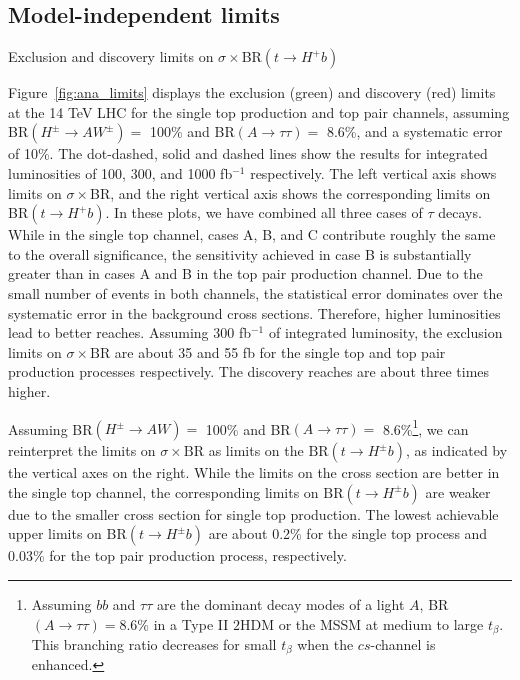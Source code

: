 \subsection{Model-independent limits}\label{subsec:ana_limits}

\begin{marginfigure}[-2.8in]
  \caption{Exclusion and discovery limits on $\sigma\times$BR$(t\rightarrow H^+b)$}
  \label{fig:ana_limits}
\end{marginfigure}

Figure~\ref{fig:ana_limits} displays the exclusion (green) and discovery (red) limits at the 14 TeV LHC for the single top production and top pair channels, assuming BR$(H^\pm\rightarrow AW^\pm) =$ 100\% and BR$(A\rightarrow\tau\tau) =$ 8.6\%, and a systematic error of 10\%. The dot-dashed, solid and dashed lines show the results for integrated luminosities of 100, 300, and 1000 fb$^{-1}$ respectively. The left vertical axis shows limits on $\sigma\times$BR, and the right vertical axis shows the corresponding limits on BR$(t\rightarrow H^+ b)$. In these plots, we have combined all three cases of $\tau$ decays. While in the single top channel, cases A, B, and C contribute roughly the same to the overall significance, the sensitivity achieved in case B is substantially greater than in cases A and B in the top pair production channel. Due to the small number of events in both channels, the statistical error dominates over the systematic error in the background cross sections. Therefore, higher luminosities lead to better reaches. Assuming 300 fb$^{-1}$ of integrated luminosity, the exclusion limits on $\sigma\times\text{BR}$ are about 35 and 55 fb for the single top and top pair production processes respectively. The discovery reaches are about three times higher. 

Assuming BR$(H^{\pm} \rightarrow A W )=$ 100\% and BR$(A \rightarrow \tau\tau)=$ 8.6\%\footnote{Assuming $bb$ and $\tau\tau$ are the dominant decay modes of a light $A$, BR$(A \rightarrow \tau\tau)=8.6$\% in a Type II $2$HDM or the MSSM at medium to large $t_{\beta}$. This branching ratio decreases for small $t_{\beta}$ when the $cs$-channel is enhanced.}, we can reinterpret the limits on $\sigma\times\text{BR}$ as limits on the $\text{BR}(t \rightarrow H^{\pm} b)$, as indicated by the vertical axes on the right. While the limits on the cross section are better in the single top channel, the corresponding limits on $\text{BR}(t \rightarrow H^{\pm} b)$ are weaker due to the smaller cross section for single top production. The lowest achievable upper limits on BR$(t \rightarrow H^{\pm} b)$ are about 0.2\% for the single top process and 0.03\% for the top pair production process, respectively.

